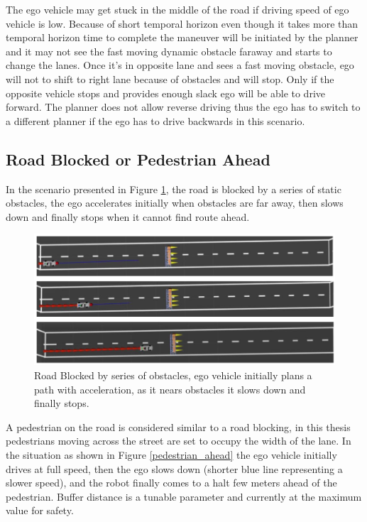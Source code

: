 The ego vehicle may get stuck in the middle of the road if driving speed of ego vehicle is low. Because of short temporal horizon even though it takes more than temporal horizon time to complete the maneuver will be initiated by the planner and it may not see the fast moving dynamic obstacle faraway and starts to change the lanes. Once it's in opposite lane and sees a fast moving obstacle, ego will not to shift to right lane because of obstacles and will stop. Only if the opposite vehicle stops and provides enough slack ego will be able to drive forward. The planner does not allow reverse driving thus the ego has to switch to a different planner if the ego has to drive backwards in this scenario. 


\subsection{Road Blocked or Pedestrian Ahead}

In the scenario presented in Figure \ref{road_blocked}, the road is blocked by a series of static obstacles, the ego accelerates initially when obstacles are far away, then slows down and finally stops when it cannot find route ahead. 

\begin{figure}
    \centering
    \includegraphics[width=1.0\textwidth]{Images/evaluation/stopping_lane_blocked.jpg}
    \caption{Road Blocked by series of obstacles, ego vehicle initially plans a path with acceleration, as it nears obstacles it slows down and finally stops.}
    \label{road_blocked}
\end{figure}

A pedestrian on the road is considered similar to a road blocking, in this thesis pedestrians moving across the street are set to occupy the width of the lane. In the situation as shown in Figure \ref{pedestrian_ahead} the ego vehicle initially drives at full speed, then the ego slows down (shorter blue line representing a slower speed), and the robot finally comes to a halt few meters ahead of the pedestrian. Buffer distance is a tunable parameter and currently at the maximum value for safety. 

